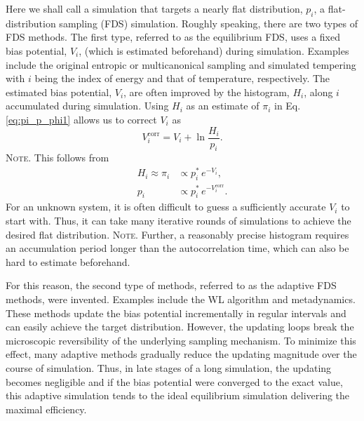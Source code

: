 \documentclass[reprint, floatfix]{revtex4-1}
\newcommand{\note}[1]{{\color{DarkGreen}\footnotesize \textsc{Note.} #1}}
\begin{document}
Here we shall call a simulation that targets
a nearly flat distribution\cite{
dayal2004, trebst2004, singh2011},
$p_i$,
a flat-distribution sampling (FDS) simulation.
%
Roughly speaking, there are two types of FDS methods.
%
The first type,
referred to as the equilibrium FDS, %
uses a fixed bias potential, $V_i$,
(which is estimated beforehand)
during simulation.
%
Examples include the original
entropic or multicanonical sampling\cite{
berg1992, lee1993}
and simulated tempering\cite{
marinari1992, lyubartsev1992}
with $i$ being the index of energy
and that of temperature, respectively.
%
The estimated bias potential, $V_i$,
are often improved
by the histogram, $H_i$, along $i$ accumulated
during simulation.
%
Using $H_i$ as an estimate of $\pi_i$ in
Eq. \eqref{eq:pi_p_phi1}
allows us to correct $V_i$ as
%
\begin{equation}
V^\mathrm{corr}_i
=
V_i
+
\ln \frac{ H_i }
         { p_i }.
\label{eq:vcorr_equil}
\end{equation}
%
\note{This follows from
  $$
  \begin{aligned}
    H_i \approx \pi_i
    &\propto p^*_i \, e^{-V_i},
    \\
    p_i
    &\propto p^*_i \, e^{-V^\mathrm{corr}_i}.
  \end{aligned}
  $$
}
For an unknown system,
it is often difficult
to guess a sufficiently accurate
$V_i$ to start with.
%
Thus,
it can take many iterative rounds of simulations
to achieve the desired flat distribution.
%
\note{Further, a reasonably precise histogram
requires an accumulation period
longer than the autocorrelation time,
which can also be hard to estimate beforehand.}

For this reason, the second type of methods,
referred to as the adaptive FDS methods,
were invented.
%
Examples include
the WL algorithm and metadynamics.
%
These methods update the bias potential
incrementally in regular intervals
and can easily achieve the target distribution.
%
However,
the updating loops break the microscopic reversibility
of the underlying sampling mechanism.
%
%
To minimize this effect,
many adaptive methods gradually
reduce the updating magnitude
over the course of simulation\cite{
marsili2006,
liang2007,
belardinelli2007, belardinelli2007jcp, belardinelli2008,
barducci2008}.
%
Thus, in late stages of a long simulation,
the updating becomes negligible and
%
if the bias potential were converged to the exact value,
this adaptive simulation tends to the ideal equilibrium simulation
delivering the maximal efficiency.
\end{document}
